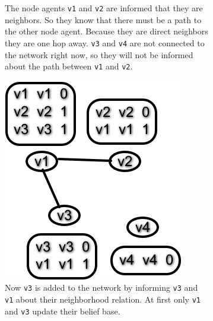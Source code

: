 \begin{figure}
\begin{subfigure}{.45\textwidth}
        \caption{The node agents \texttt{v1} and \texttt{v2} are informed that they are neighbors. So they know that there must be a path to the other node agent. Because they are direct neighbors they are one hop away. \texttt{v3} and \texttt{v4} are not connected to the network right now, so they will not be informed about the path between \texttt{v1} and \texttt{v2}.}
    \end{subfigure}
    
    \begin{subfigure}{.45\textwidth}
       \includegraphics[width=\textwidth] {images/dv2.png}
       \caption{Now \texttt{v3} is added to the network by informing \texttt{v3} and \texttt{v1} about their neighborhood relation. At first only \texttt{v1}  and \texttt{v3} update their belief base.}
    \end{subfigure}\quad
    \begin{subfigure}{.45\textwidth}

\end{subfigure}
\end{figure}
